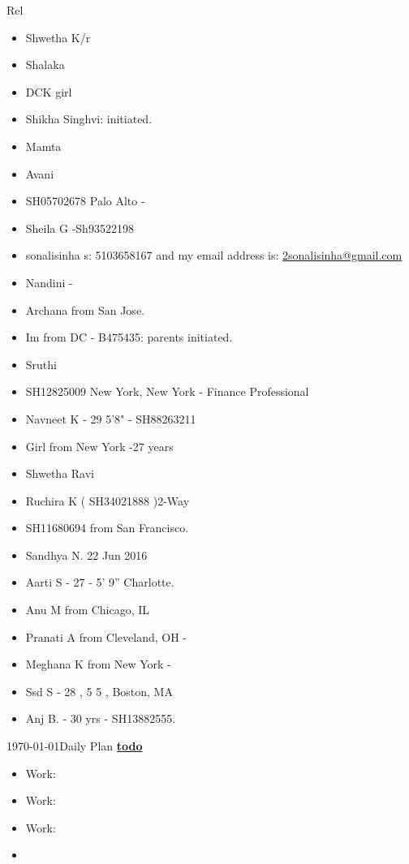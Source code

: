 \begin{columns}
\begin{column}{0.333\columnwidth}
  \begin{block}{Rel} 
    \begin{itemize} 
      \small \item \small Shwetha K/r
    \item \small Shalaka 
    \item \tiny DCK girl 
    \item \tiny  Shikha Singhvi: initiated.  
    \item \small Mamta
    \item \small Avani 
    \item \small SH05702678 Palo Alto - 
    \item \small Sheila G -Sh93522198  
    \item \small sonalisinha  s: 5103658167 and my email address is: \url{2sonalisinha@gmail.com}
    \item \small Nandini  - 
    \item \small Archana from San Jose. 
    \item \small Im from DC  - B475435: parents initiated. 
    \item \small Sruthi 
    \item \small SH12825009 New York, New York - Finance Professional 
    \item \small Navneet K  - 29 5'8" - SH88263211 
    \item \small Girl from New York  -27 years
    \item \small Shwetha Ravi 
    \item \small Ruchira K ( SH34021888 )2-Way           
    \item \small SH11680694 from San Francisco. 
    \item \small Sandhya N. 22 Jun 2016 
    \item \small Aarti S - 27 - 5' 9'' Charlotte.  
    \item \small Anu M from Chicago, IL 
    \item \small Pranati A from Cleveland, OH - 
    \item \small Meghana K from New York - 
    \item \small Ssd S - 28 , 5 5 , Boston, MA 
    \item \small Anj B. - 30 yrs - SH13882555.
    \end{itemize}
  \end{block} 

\begin{frame}{\today}{Daily Plan}
\underline{\bf todo}\\
\begin{itemize}
\tiny \item \tiny Work: 
\item \tiny Work:
\item \tiny Work: 
\item \tiny
\end{itemize}


\end{frame}
\end{column}
\end{columns}
